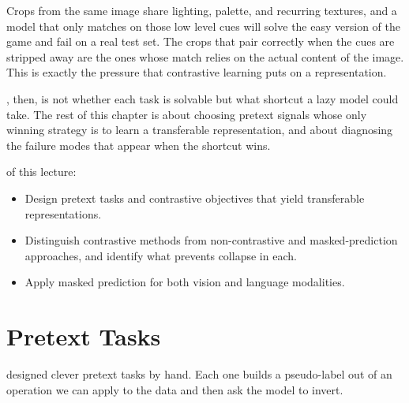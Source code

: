 Crops from the same image share lighting, palette, and recurring textures, and a model that only matches on those low level cues will solve the easy version of the game and fail on a real test set. The crops that pair correctly when the cues are stripped away are the ones whose match relies on the actual content of the image. This is exactly the pressure that contrastive learning puts on a representation.


, then, is not whether each task is solvable but what shortcut a lazy model could take. The rest of this chapter is about choosing pretext signals whose only winning strategy is to learn a transferable representation, and about diagnosing the failure modes that appear when the shortcut wins.

 of this lecture:
\begin{itemize}
    \item Design pretext tasks and contrastive objectives that yield transferable representations.
    \item Distinguish contrastive methods from non-contrastive and masked-prediction approaches, and identify what prevents collapse in each.
    \item Apply masked prediction for both vision and language modalities.
\end{itemize}


\newpage
\section{Pretext Tasks}


 designed clever pretext tasks by hand. Each one builds a pseudo-label out of an operation we can apply to the data and then ask the model to invert.

